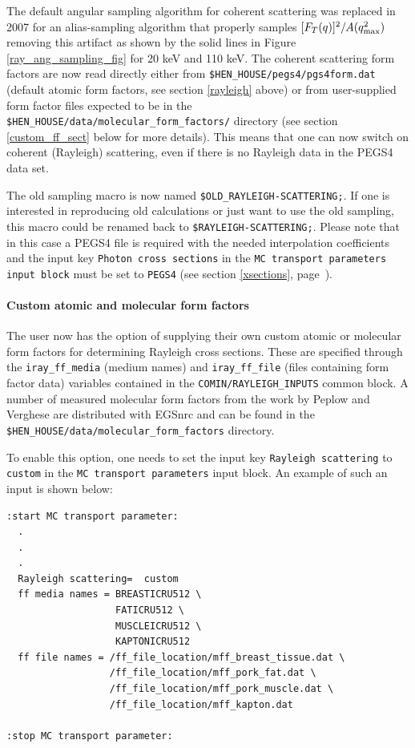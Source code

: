 The default angular sampling algorithm for coherent scattering
was replaced in 2007 for an alias-sampling algorithm that properly
samples $[F_T(q)]^2/A(q_{\rm max}^2)$ removing this artifact as shown
by the solid lines in Figure \ref{ray_ang_sampling_fig} for 20 keV
and 110 keV. The coherent scattering form factors are now
read directly either from {\tt \$HEN\_HOUSE/pegs4/pgs4form.dat}
(default atomic form factors, see section \ref{rayleigh} above) or from
user-supplied form factor files expected to be in the
{\tt \$HEN\_HOUSE/data/molecular\_form\_factors/} directory
(see section \ref{custom_ff_sect} below for more details).
This means that one can now switch on coherent (Rayleigh) scattering,
even if there is no Rayleigh data in the PEGS4 data set.

The old sampling macro is now named {\tt \$OLD\_RAYLEIGH-SCATTERING;}.
If one is interested
in reproducing old calculations or just want to use the old sampling,
this macro could be renamed back to {\tt \$RAYLEIGH-SCATTERING;}.
Please note that in this case a PEGS4 file is required with the needed
interpolation coefficients and the input key {\tt Photon cross sections}
in the {\tt MC transport parameters input block} must be set to {\tt PEGS4}
(see section \ref{xsections}, page~\pageref{xsections}).

\paragraph{Custom atomic and molecular form factors}\hfill
\label{custom_ff_sect}

The user now has the option of supplying their own custom atomic
or molecular form factors for determining Rayleigh cross sections.
These are specified through the {\tt iray\_ff\_media} (medium names) and
{\tt iray\_ff\_file} (files containing form factor data)
variables contained in the
{\tt COMIN/RAYLEIGH\_INPUTS} common block.
A number of measured molecular form factors from the work by
Peplow and Verghese \cite{PV98} are distributed with EGSnrc and can be
found in the {\tt \$HEN\_HOUSE/data/molecular\_form\_factors} directory.

To enable this option, one needs to set the input key {\tt Rayleigh scattering}
to {\tt custom} in the {\tt MC transport parameters} input block. An example
of such an input is shown below:

\begin{verbatim}
:start MC transport parameter:
  .
  .
  .
  Rayleigh scattering=  custom
  ff media names = BREASTICRU512 \
                   FATICRU512 \
                   MUSCLEICRU512 \
                   KAPTONICRU512
  ff file names = /ff_file_location/mff_breast_tissue.dat \
                  /ff_file_location/mff_pork_fat.dat \
                  /ff_file_location/mff_pork_muscle.dat \
                  /ff_file_location/mff_kapton.dat

:stop MC transport parameter:
\end{verbatim}

